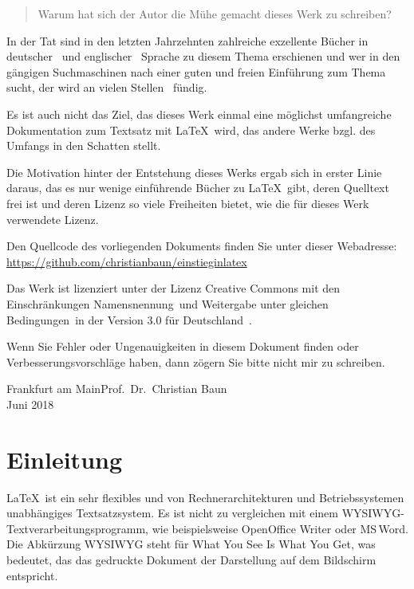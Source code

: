 \documentclass[a4paper,10pt,twoside]{scrbook}
\begin{document}
\begin{quote}
\glqq Warum hat sich der Autor die Mühe gemacht dieses Werk zu schreiben?\grqq
\end{quote}

In der Tat sind in den letzten Jahrzehnten zahlreiche exzellente Bücher in deutscher~\cite{Kopka2000,GoossensMittelachSamarin2000,voss2016einfuhrung} und englischer~\cite{mittelbach2004latex,kopka2003guide} Sprache zu diesem Thema erschienen und wer in den gängigen Suchmaschinen nach einer guten und freien Einführung zum Thema sucht, der wird an vielen Stellen~\cite{KrauseLink,JuergensFeuerstackLink,RichterTorstenLink,MarxBueckerLink,NagelLink,GitterLink} fündig.

Es ist auch nicht das Ziel, das dieses Werk einmal eine möglichst umfangreiche Dokumentation zum Textsatz mit \LaTeX\ wird, das andere Werke bzgl. des Umfangs in den Schatten stellt. 

Die Motivation hinter der Entstehung dieses Werks ergab sich in erster Linie daraus, das es nur wenige einführende Bücher zu \LaTeX\ gibt, deren Quelltext frei ist und deren Lizenz so viele Freiheiten bietet, wie die für dieses Werk verwendete Lizenz.

Den Quellcode des vorliegenden Dokuments finden Sie unter dieser Webadresse:\\
\url{https://github.com/christianbaun/einstieginlatex}

Das Werk ist lizenziert unter der Lizenz Creative Commons mit den Einschränkungen \glqq Namensnennung\grqq\ und \glqq Weitergabe unter gleichen Bedingungen\grqq\ in der Version 3.0 für Deutschland~\cite{CC-BY-SA-3.0License}.

Wenn Sie Fehler oder Ungenauigkeiten in diesem Dokument finden oder Verbesserungsvorschläge haben, dann zögern Sie bitte nicht mir zu schreiben. 

\begin{flushright} 
Frankfurt am Main\hfill Prof.~Dr.~Christian Baun\\
Juni 2018
\end{flushright}

\mainmatter        %


\mainmatter

\chapter{Einleitung}


\LaTeX\ ist ein sehr flexibles und von Rechnerarchitekturen
und Betriebssystemen unabhängiges 
Textsatzsystem. Es ist nicht zu vergleichen mit einem WYSIWYG-Textverarbeitungsprogramm, wie beispielsweise OpenOffice Writer oder MS\,Word. Die Abkürzung WYSIWYG steht für \glqq What You See Is What You Get\grqq, was bedeutet, das das gedruckte Dokument der Darstellung auf dem Bildschirm entspricht. 
\end{document}
